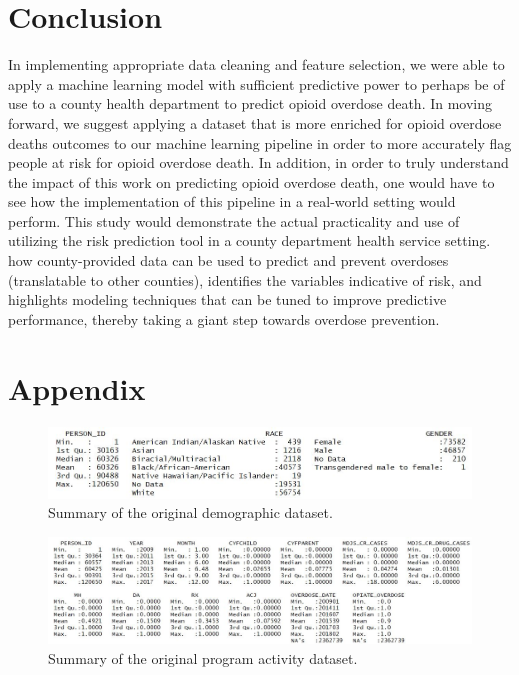 \documentclass[twoside,10.5pt]{article}
\begin{document}
\section{Conclusion}
In implementing appropriate data cleaning and feature selection, we were able to apply a machine learning model with sufficient predictive power to perhaps be of use to a county health department to predict opioid overdose death. In moving forward, we suggest applying a dataset that is more enriched for opioid overdose deaths outcomes to our machine learning pipeline in order to more accurately flag people at risk for opioid overdose death. In addition, in order to truly understand the impact of this work on predicting opioid overdose death, one would have to see how the implementation of this pipeline in a real-world setting would perform. This study would demonstrate the actual practicality and use of utilizing the risk prediction tool in a county department health service setting.\\

how county-provided data can be used to predict and prevent overdoses (translatable to other counties), identifies the variables indicative of risk, and highlights modeling techniques that can be tuned to improve predictive performance, thereby taking a giant step towards overdose prevention. 

\newpage
\appendix
\section*{Appendix}

\begin{figure}[h!]
\begin{center}
\includegraphics[width=5in]{images/original_dem_summary.JPG}
\end{center}
\caption{Summary of the original demographic dataset.}
\label{fig:orig_dem}
\end{figure}

\begin{figure}[h!]
\begin{center}
\includegraphics[width=6in]{images/original_prog_summary.JPG}
\end{center}
\caption{Summary of the original program activity dataset.}
\label{fig:orig_prog}
\end{figure}
\end{document}
